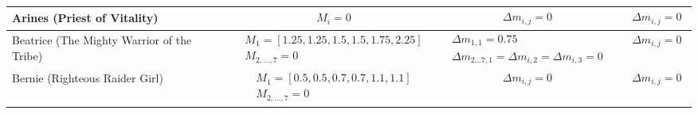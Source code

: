 \documentclass[twocolumn,10pt]{article}
\begin{document}
\begin{landscape}
\begin{longtable}{lccc}
Arines (Priest of Vitality) &
$\begin{aligned}
& M_{i} = 0
\end{aligned}$ &
$\begin{aligned}
& \Delta m_{i, j} = 0
\end{aligned}$ &
$\begin{aligned}
& \Delta m_{i,j} = 0
\end{aligned}$ \\
\midrule

Beatrice (The Mighty Warrior of the Tribe) &
$\begin{aligned}
& M_1 = [1.25, 1.25, 1.5, 1.5, 1.75, 2.25] \\
& M_{2,\dots,7} = 0
\end{aligned}$ &
$\begin{aligned}
& \Delta m_{1,1} = 0.75 \\
& \Delta m_{2\dots7, 1} = \Delta m_{i,2} = \Delta m_{i,3} = 0
\end{aligned}$ &
$\begin{aligned}
& \Delta m_{i,j} = 0
\end{aligned}$ \\
\midrule


Bernie (Righteous Raider Girl) &
$\begin{aligned}
& M_1 = [0.5, 0.5, 0.7, 0.7, 1.1, 1.1] \\
& M_{2,\dots,7} = 0
\end{aligned}$ &
$\begin{aligned}
& \Delta m_{i,j} = 0
\end{aligned}$ &
$\begin{aligned}
& \Delta m_{i,j} = 0
\end{aligned}$ \\
\midrule


\end{longtable}
\end{landscape}
\end{document}
